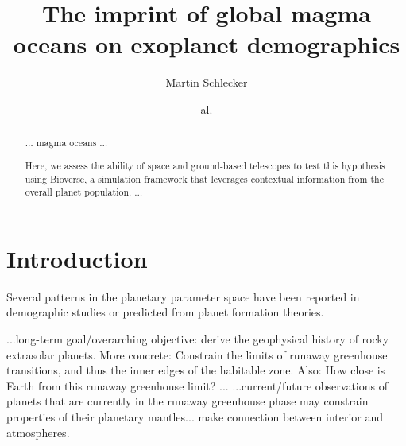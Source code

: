 \documentclass[modern]{aastex631}
\begin{document}
\title{The imprint of global magma oceans on exoplanet demographics}

\author[0000-0001-8355-2107]{Martin Schlecker}
\author{al.}


\begin{abstract}
    $\ldots$ magma oceans $\ldots$

    Here, we assess the ability of space and ground-based telescopes to test this hypothesis using Bioverse, a simulation framework that leverages contextual information from the overall planet population.
    $\ldots$

\end{abstract}

\section{Introduction}



Several patterns in the planetary parameter space have been reported in demographic studies or predicted from planet formation theories.
\begin{note}
    ...long-term goal/overarching objective: derive the geophysical history of rocky extrasolar planets. More concrete: Constrain the limits of runaway greenhouse transitions, and thus the inner edges of the habitable zone. Also: How close is Earth from this runaway greenhouse limit?
   ...
    ...current/future observations of planets that are currently in the runaway greenhouse phase may constrain properties of their planetary mantles... make connection between interior and atmospheres.
\end{note}
\end{document}

